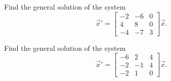 \documentclass{ximera}
\begin{document}
\begin{exercise}%
    Find the general solution of the system
    \begin{equation*}
        {\vec{x}}' = 
        \begin{bmatrix} 
            -2 & -6 & 0 \\ 
            4 & 8 & 0 \\ 
            -4 & -7 & 3 
        \end{bmatrix} \vec{x}.
    \end{equation*}
\end{exercise}

\begin{exercise}%
    Find the general solution of the system
    \begin{equation*}
        {\vec{x}}' = 
        \begin{bmatrix} 
            -6 & 2 & 4 \\ 
            -2 & -1 & 4 \\ 
            -2 & 1 & 0 
        \end{bmatrix} \vec{x}.
    \end{equation*}
\end{exercise}
\end{document}
